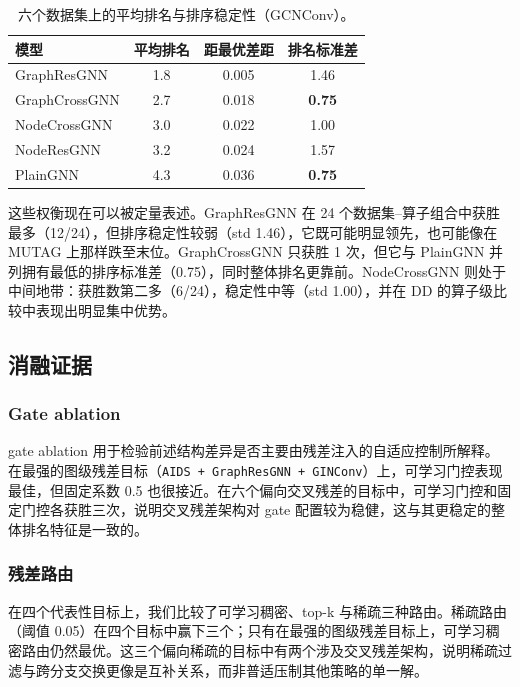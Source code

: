 \begin{table}[h]
\centering
\small
\caption{六个数据集上的平均排名与排序稳定性（GCNConv）。}
\label{tab:consistency}
\begin{tabular}{l c c c}
\toprule
模型 & 平均排名 & 距最优差距 & 排名标准差 \\
\midrule
GraphResGNN & 1.8 & 0.005 & 1.46 \\
GraphCrossGNN & 2.7 & 0.018 & \textbf{0.75} \\
NodeCrossGNN & 3.0 & 0.022 & 1.00 \\
NodeResGNN & 3.2 & 0.024 & 1.57 \\
PlainGNN & 4.3 & 0.036 & \textbf{0.75} \\
\bottomrule
\end{tabular}
\end{table}

这些权衡现在可以被定量表述。GraphResGNN 在 24 个数据集--算子组合中获胜最多（12/24），但排序稳定性较弱（std 1.46），它既可能明显领先，也可能像在 MUTAG 上那样跌至末位。GraphCrossGNN 只获胜 1 次，但它与 PlainGNN 并列拥有最低的排序标准差（0.75），同时整体排名更靠前。NodeCrossGNN 则处于中间地带：获胜数第二多（6/24），稳定性中等（std 1.00），并在 DD 的算子级比较中表现出明显集中优势。

\subsection{消融证据}

\subsubsection{Gate ablation}





gate ablation 用于检验前述结构差异是否主要由残差注入的自适应控制所解释。在最强的图级残差目标（\texttt{AIDS + GraphResGNN + GINConv}）上，可学习门控表现最佳，但固定系数 0.5 也很接近。在六个偏向交叉残差的目标中，可学习门控和固定门控各获胜三次，说明交叉残差架构对 gate 配置较为稳健，这与其更稳定的整体排名特征是一致的。

\subsubsection{残差路由}



在四个代表性目标上，我们比较了可学习稠密、top-k 与稀疏三种路由。稀疏路由（阈值 0.05）在四个目标中赢下三个；只有在最强的图级残差目标上，可学习稠密路由仍然最优。这三个偏向稀疏的目标中有两个涉及交叉残差架构，说明稀疏过滤与跨分支交换更像是互补关系，而非普适压制其他策略的单一解。

